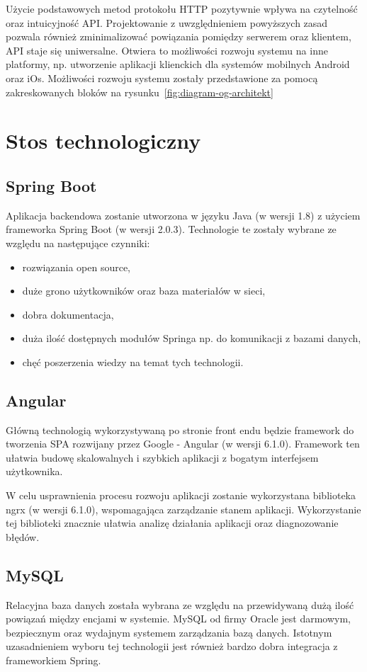 Użycie podstawowych metod protokołu HTTP pozytywnie wpływa na czytelność oraz intuicyjność API. Projektowanie z uwzględnieniem powyższych zasad pozwala również zminimalizować powiązania pomiędzy serwerem oraz klientem, API staje się uniwersalne. Otwiera to możliwości rozwoju systemu na inne platformy, np. utworzenie aplikacji klienckich dla systemów mobilnych Android oraz iOs. Możliwości rozwoju systemu zostały przedstawione za pomocą zakreskowanych bloków na rysunku~\ref{fig:diagram-og-architekt}

\section{Stos technologiczny}

\subsection{Spring Boot}

Aplikacja backendowa zostanie utworzona w języku Java (w wersji 1.8) z użyciem frameworka Spring Boot (w wersji 2.0.3). Technologie te zostały wybrane ze względu na następujące czynniki:
 \begin{itemize}
\item rozwiązania open source,
\item duże grono użytkowników oraz baza materiałów w sieci,
\item dobra dokumentacja,
\item duża ilość dostępnych modułów Springa np. do komunikacji z bazami danych,
\item chęć poszerzenia wiedzy na temat tych technologii.
\end{itemize}

\subsection{Angular}

Główną technologią wykorzystywaną po stronie front endu będzie framework do tworzenia SPA rozwijany przez Google - Angular (w wersji 6.1.0). Framework ten ułatwia budowę skalowalnych i szybkich aplikacji z bogatym interfejsem użytkownika. 

W celu usprawnienia procesu rozwoju aplikacji zostanie wykorzystana biblioteka ngrx (w wersji 6.1.0), wspomagająca zarządzanie stanem aplikacji. Wykorzystanie tej biblioteki znacznie ułatwia analizę działania aplikacji oraz diagnozowanie błędów.

\subsection{MySQL} 

Relacyjna baza danych została wybrana ze względu na przewidywaną dużą ilość powiązań między encjami w systemie. MySQL od firmy Oracle jest darmowym, bezpiecznym oraz wydajnym systemem zarządzania bazą danych.  Istotnym uzasadnieniem wyboru tej technologii jest również bardzo dobra integracja z frameworkiem Spring.
